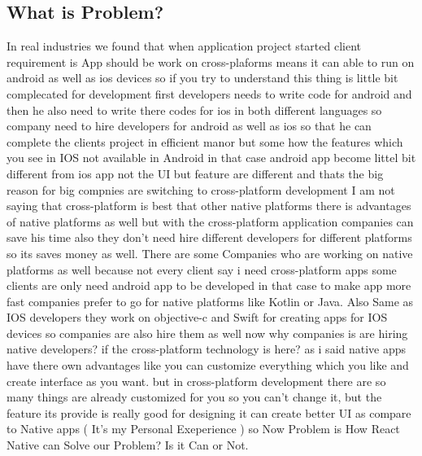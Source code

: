 \documentclass[12pt,a4paper]{article}
\begin{document}
\subsection*{What is Problem?}
\qquad In real industries we found that when application project started client requirement is App should be work on cross-plaforms means it can able to run on android as well as ios devices so if you try to understand this thing is little bit complecated for development first developers needs to write code for android and then he also need to write there codes for ios in both different languages so company need to hire developers for android as well as ios so that he can complete the clients project in efficient manor but some how the features which you see in IOS not available in Android in that case android app become littel bit different from ios app not the UI but feature are different and thats the big reason for big compnies are switching to cross-platform development I am not saying that cross-platform is best that other native platforms there is advantages  of native platforms as well but with the cross-platform application companies can save his time also they don't need hire different developers for different platforms so its saves money as well. There are some Companies who are working on native platforms as well because not every client say i need cross-platform apps some clients are only need android app to be developed in that case to make app more fast companies prefer to go for native platforms like Kotlin or Java. Also Same as IOS developers they work on objective-c and Swift for creating apps for IOS devices so companies are also hire them as well now why companies is are hiring native developers? if the cross-platform technology is here? as i said native apps have there own advantages like you can customize everything which you like and create interface as you want. but in cross-platform development there are so many things are already customized for you so you can't change it, but the feature its provide is really good for designing it can create better UI as compare to Native apps ( It's my Personal Exeperience ) so Now Problem is How React Native can Solve our Problem? Is it Can or Not.

\newpage
\end{document}
